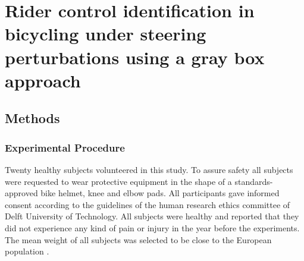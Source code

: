 \chapter{Rider control identification in bicycling under steering perturbations using a gray box approach} \label{ch:4}

\section{Methods}

\subsection{Experimental Procedure}

Twenty healthy subjects volunteered in this study. To assure safety all subjects were requested to wear protective equipment in the shape of a standards-approved bike helmet, knee and elbow pads. All participants gave informed consent according to the guidelines of the human research ethics committee of Delft University of Technology. All subjects were healthy and reported that they did not experience any kind of pain or injury in the year before the experiments. The mean weight of all subjects was selected to be close to the European population \cite{walpole2012weight}.

